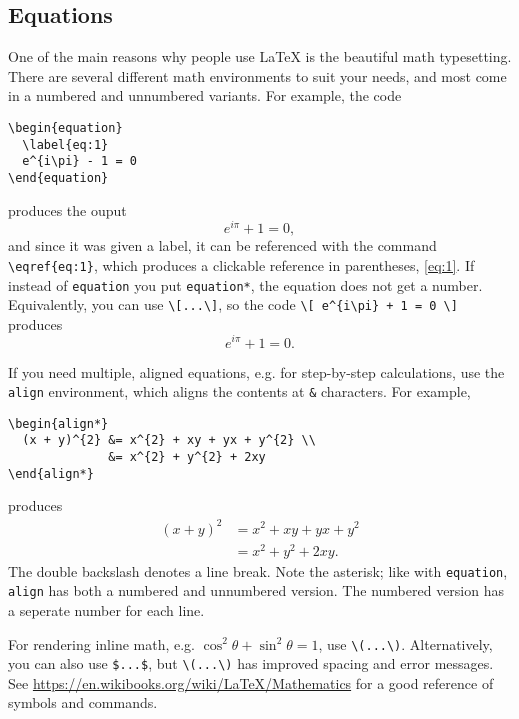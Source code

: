 \subsection{Equations}
\label{sec:equations}

One of the main reasons why people use \LaTeX{} is the beautiful math typesetting.
There are several different math environments to suit your needs, and most come in a numbered and unnumbered variants.
For example, the code
%
\begin{verbatim}
\begin{equation}
  \label{eq:1}
  e^{i\pi} - 1 = 0
\end{equation}
\end{verbatim}
%
produces the ouput
%
\begin{equation}
  \label{eq:1}
  e^{i\pi} + 1 = 0 ,
\end{equation}
%
and since it was given a label, it can be referenced with the command \verb!\eqref{eq:1}!, which produces a clickable reference in parentheses, \eqref{eq:1}.
If instead of \texttt{equation} you put \texttt{equation*}, the equation does not get a number.
Equivalently, you can use \verb!\[...\]!, so the code \verb!\[ e^{i\pi} + 1 = 0 \]! produces
\[ e^{i\pi} + 1 = 0 .\]

If you need multiple, aligned equations, e.g. for step-by-step calculations, use the \texttt{align} environment, which aligns the contents at \texttt{\&} characters.
For example,
%
\begin{verbatim}
\begin{align*}
  (x + y)^{2} &= x^{2} + xy + yx + y^{2} \\
              &= x^{2} + y^{2} + 2xy
\end{align*}
\end{verbatim}
%
produces
%
\begin{align*}
  (x + y)^{2} &= x^{2} + xy + yx + y^{2} \\
              &= x^{2} + y^{2} + 2xy .
\end{align*}
%
The double backslash denotes a line break.
Note the asterisk; like with \texttt{equation}, \texttt{align} has both a numbered and unnumbered version.
The numbered version has a seperate number for each line.

For rendering inline math, e.g. \(\cos^{2}\theta + \sin^{2}\theta = 1\), use \verb!\(...\)!.
Alternatively, you can also use \verb!$...$!, but \verb!\(...\)! has improved spacing and error messages.
%
See \url{https://en.wikibooks.org/wiki/LaTeX/Mathematics} for a good reference of symbols and commands.


